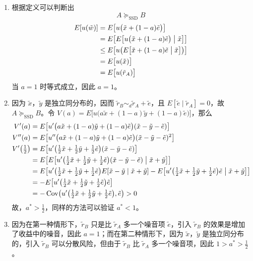\begin{solution}
\begin{enumerate}[label=(\alph*)]
    \item 根据定义可以判断出
    \[
        A\succeq_{\mathrm{SSD}}B
    \]
    \[
        \begin{aligned}
            E[u(\tilde{w})]
            &=E\bigl[u\bigl(\tilde{x}+(1-a)\tilde{e}\bigr)\bigr]\\
            &=E\bigl[E\bigl[u\bigl(\tilde{x}+(1-a)\tilde{e}\bigr)\bigm|\tilde{x}\bigr]\bigr]\\
            &\le E\bigl[u\bigl(E\bigl[\tilde{x}+(1-a)\tilde{e}\bigm|\tilde{x}\bigr]\bigr)\bigr]\\
            &=E\bigl[u(\tilde{x})\bigr]\\
            &=E\bigl[u(\tilde{r}_{A})\bigr]
        \end{aligned}
    \]
    当 $a=1$ 时等式成立，因此 $a=1$。

    \item 因为 $\tilde{x}$，$\tilde{y}$ 是独立同分布的，因而 $\tilde{r}_{B}\sim_{d}\tilde{r}_{A}+\tilde{e}$，且 $E[\tilde{e}\mid\tilde{r}_{A}]=0$，故 $A\succeq_{\mathrm{SSD}}B$。令 $V(a)=E\bigl[u\bigl(a\tilde{x}+(1-a)\tilde{y}+(1-a)\tilde{e}\bigr)\bigr]$，那么
    \[
        \begin{aligned}
            V'(a)&=E\bigl[u'\bigl(a\tilde{x}+(1-a)\tilde{y}+(1-a)\tilde{e}\bigr)(\tilde{x}-\tilde{y}-\tilde{e})\bigr]\\
            V''(a)&=E\bigl[u''\bigl(a\tilde{x}+(1-a)\tilde{y}+(1-a)\tilde{e}\bigr)(\tilde{x}-\tilde{y}-\tilde{e})^{2}\bigr]\\
            V'\bigl(\tfrac12\bigr)&=E\bigl[u'\bigl(\tfrac12\tilde{x}+\tfrac12\tilde{y}+\tfrac12\tilde{e}\bigr)(\tilde{x}-\tilde{y}-\tilde{e})\bigr]\\
            &=E\bigl[E\bigl[u'\bigl(\tfrac12\tilde{x}+\tfrac12\tilde{y}+\tfrac12\tilde{e}\bigr)(\tilde{x}-\tilde{y}-\tilde{e})\bigm|\tilde{x}+\tilde{y}\bigr]\bigr]\\
            &=E\bigl[u'\bigl(\tfrac12\tilde{x}+\tfrac12\tilde{y}+\tfrac12\tilde{e}\bigr)E[\tilde{x}-\tilde{y}\mid\tilde{x}+\tilde{y}]-E\bigl[u'\bigl(\tfrac12\tilde{x}+\tfrac12\tilde{y}+\tfrac12\tilde{e}\bigr)\tilde{e}\bigm|\tilde{x}+\tilde{y}\bigr]\bigr]\\
            &=-E\bigl[u'\bigl(\tfrac12\tilde{x}+\tfrac12\tilde{y}+\tfrac12\tilde{e}\bigr)\tilde{e}\bigr]\\
            &=-\operatorname{Cov}\bigl(u'\bigl(\tfrac12\tilde{x}+\tfrac12\tilde{y}+\tfrac12\tilde{e}\bigr),\tilde{e}\bigr)>0
        \end{aligned}
    \]
    故，$a^{*}>\frac12$，同样的方法可以验证 $a^{*}<1$。

    \item 因为在第一种情形下，$\tilde{r}_{B}$ 只是比 $\tilde{r}_{A}$ 多一个噪音项 $\tilde{e}$，引入 $\tilde{r}_{B}$ 的效果是增加了收益中的噪音，因此 $a=1$；而在第二种情形下，因为 $\tilde{x}$，$\tilde{y}$ 是独立同分布的，引入 $\tilde{r}_{B}$ 可以分散风险，但由于 $\tilde{r}_{B}$ 比 $\tilde{r}_{A}$ 多一个噪音项，因此 $1>a^{*}>\frac12$。
\end{enumerate}
\end{solution}


